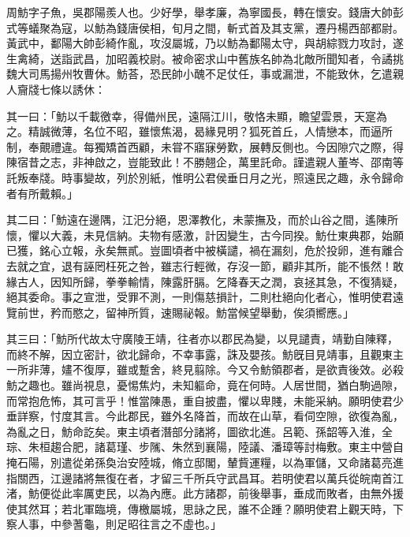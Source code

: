 \begin{pinyinscope}
 
 
 周魴字子魚，吳郡陽羨人也。少好學，舉孝廉，為寧國長，轉在懷安。錢唐大帥彭式等蟻聚為寇，以魴為錢唐侯相，旬月之間，斬式首及其支黨，遷丹楊西部都尉。黃武中，鄱陽大帥彭綺作亂，攻沒屬城，乃以魴為鄱陽太守，與胡綜戮力攻討，遂生禽綺，送詣武昌，加昭義校尉。被命密求山中舊族名帥為北敵所聞知者，令譎挑魏大司馬揚州牧曹休。魴荅，恐民帥小醜不足仗任，事或漏泄，不能致休，乞遣親人齎牋七條以誘休：
 
 
 
 
 其一曰：「魴以千載徼幸，得備州民，遠隔江川，敬恪未顯，瞻望雲景，天寔為之。精誠微薄，名位不昭，雖懷焦渴，曷緣見明？狐死首丘，人情戀本，而逼所制，奉覿禮違。每獨矯首西顧，未甞不寤寐勞歎，展轉反側也。今因隙穴之際，得陳宿昔之志，非神啟之，豈能致此！不勝翹企，萬里託命。謹遣親人董岑、邵南等託叛奉牋。時事變故，列於別紙，惟明公君侯垂日月之光，照遠民之趣，永令歸命者有所戴賴。」
 
 
 
 
 其二曰：「魴遠在邊隅，江汜分絕，恩澤教化，未蒙撫及，而於山谷之間，遙陳所懷，懼以大義，未見信納。夫物有感激，計因變生，古今同揆。魴仕東典郡，始願已獲，銘心立報，永矣無貳。豈圖頃者中被橫譴，禍在漏刻，危於投卵，進有離合去就之宜，退有誣罔枉死之咎，雖志行輕微，存沒一節，顧非其所，能不悵然！敢緣古人，因知所歸，拳拳輸情，陳露肝膈。乞降春天之潤，哀拯其急，不復猜疑，絕其委命。事之宣泄，受罪不測，一則傷慈損計，二則杜絕向化者心，惟明使君遠覽前世，矜而愍之，留神所質，速賜祕報。魴當候望舉動，俟須嚮應。」
 
 
 
 
 其三曰：「魴所代故太守廣陵王靖，往者亦以郡民為變，以見譴責，靖勤自陳釋，而終不解，因立密計，欲北歸命，不幸事露，誅及嬰孩。魴旣目見靖事，且觀東主一所非薄，嫿不復厚，雖或蹔舍，終見翦除。今又令魴領郡者，是欲責後效。必殺魴之趣也。雖尚視息，憂惕焦灼，未知軀命，竟在何時。人居世間，猶白駒過隙，而常抱危怖，其可言乎！惟當陳愚，重自披盡，懼以卑賤，未能采納。願明使君少垂詳察，忖度其言。今此郡民，雖外名降首，而故在山草，看伺空隙，欲復為亂，為亂之日，魴命訖矣。東主頃者潛部分諸將，圖欲北進。呂範、孫韶等入淮，全琮、朱桓趨合肥，諸葛瑾、步隲、朱然到襄陽，陸議、潘璋等討梅敷。東主中營自掩石陽，別遣從弟孫奐治安陸城，脩立邸閣，輦貲運糧，以為軍儲，又命諸葛亮進指關西，江邊諸將無復在者，才留三千所兵守武昌耳。若明使君以萬兵從皖南首江渚，魴便從此率厲吏民，以為內應。此方諸郡，前後舉事，垂成而敗者，由無外援使其然耳；若北軍臨境，傳檄屬城，思詠之民，誰不企踵？願明使君上觀天時，下察人事，中參蓍龜，則足昭往言之不虛也。」
 
 
 

\end{pinyinscope}

